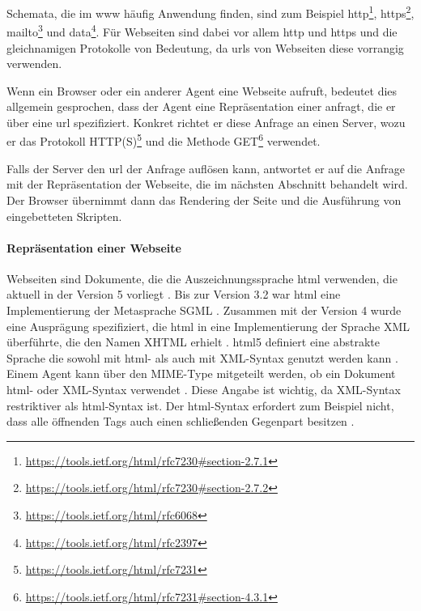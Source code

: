             Schemata, die im \gls{www} häufig Anwendung finden,
            sind zum Beispiel
            http\footnote{\url{https://tools.ietf.org/html/rfc7230\#section-2.7.1}},
            https\footnote{\url{https://tools.ietf.org/html/rfc7230\#section-2.7.2}},
            mailto\footnote{\url{https://tools.ietf.org/html/rfc6068}} und
            data\footnote{\url{https://tools.ietf.org/html/rfc2397}}.
            Für Webseiten sind dabei vor allem http und https
            und die gleichnamigen Protokolle von Bedeutung,
            da \glspl{url} von Webseiten diese vorrangig verwenden.

            Wenn ein Browser oder ein anderer Agent eine Webseite aufruft,
            bedeutet dies allgemein gesprochen, dass der Agent eine Repräsentation
            einer {\resource} anfragt, die er über eine \gls{url} spezifiziert.
            Konkret richtet er diese Anfrage an einen Server,
            wozu er das Protokoll HTTP(S)\footnote{\url{https://tools.ietf.org/html/rfc7231}} und die Methode
            GET\footnote{\url{https://tools.ietf.org/html/rfc7231\#section-4.3.1}} verwendet.

            Falls der Server den \gls{url} der Anfrage auflösen kann,
            antwortet er auf die Anfrage mit der Repräsentation der Webseite,
            die im nächsten Abschnitt behandelt wird.
            Der Browser übernimmt dann das Rendering der Seite und die Ausführung
            von eingebetteten Skripten.


            \paragraph*{Repräsentation einer Webseite}
            Webseiten sind Dokumente, die die Auszeichnungssprache \gls{html} verwenden,
            die aktuell in der Version 5 vorliegt \cite{w3c:html5}.
            Bis zur Version 3.2 war \gls{html} eine Implementierung der Metasprache SGML \cite[Kapitel 3]{w3c:html401}.
            Zusammen mit der Version 4 wurde eine Ausprägung spezifiziert,
            die \gls{html} in eine Implementierung der Sprache XML überführte,
            die den Namen XHTML erhielt \cite{w3c:xhtml}.
            \gls{html}5 definiert eine abstrakte Sprache
            die sowohl mit \gls{html}- als auch mit XML-Syntax genutzt werden kann
            \cite[Kapitel 1.6]{w3c:html5}.
            Einem Agent kann über den MIME-Type mitgeteilt werden,
            ob ein Dokument \gls{html}- oder XML-Syntax verwendet \cite[Kapitel 1.6]{w3c:html5}.
            Diese Angabe ist wichtig, da XML-Syntax restriktiver als \gls{html}-Syntax ist.
            Der \gls{html}-Syntax erfordert zum Beispiel nicht,
            dass alle öffnenden Tags auch einen schließenden Gegenpart besitzen
            \cite[Kapitel 3.2.3]{w3c:html5}.
            
